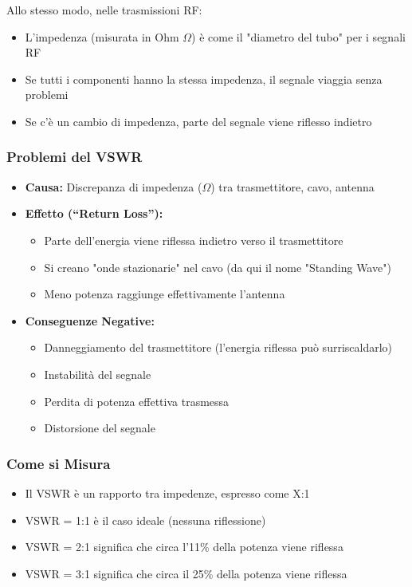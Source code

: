 Allo stesso modo, nelle trasmissioni RF:
\begin{itemize}
    \item L'impedenza (misurata in Ohm $\Omega$) è come il "diametro del tubo" per i segnali RF
    \item Se tutti i componenti hanno la stessa impedenza, il segnale viaggia senza problemi
    \item Se c'è un cambio di impedenza, parte del segnale viene riflesso indietro
\end{itemize}

\subsubsection{Problemi del VSWR}
\begin{itemize}
    \item \textbf{Causa:} Discrepanza di impedenza ($\Omega$) tra trasmettitore, cavo, antenna
    \item \textbf{Effetto (``Return Loss''):} 
    \begin{itemize}
        \item Parte dell'energia viene riflessa indietro verso il trasmettitore
        \item Si creano "onde stazionarie" nel cavo (da qui il nome "Standing Wave")
        \item Meno potenza raggiunge effettivamente l'antenna
    \end{itemize}
    \item \textbf{Conseguenze Negative:} 
    \begin{itemize}
        \item Danneggiamento del trasmettitore (l'energia riflessa può surriscaldarlo)
        \item Instabilità del segnale
        \item Perdita di potenza effettiva trasmessa
        \item Distorsione del segnale
    \end{itemize}
\end{itemize}

\subsubsection{Come si Misura}
\begin{itemize}
    \item Il VSWR è un rapporto tra impedenze, espresso come X:1
    \item VSWR = 1:1 è il caso ideale (nessuna riflessione)
    \item VSWR = 2:1 significa che circa l'11\% della potenza viene riflessa
    \item VSWR = 3:1 significa che circa il 25\% della potenza viene riflessa
\end{itemize}

